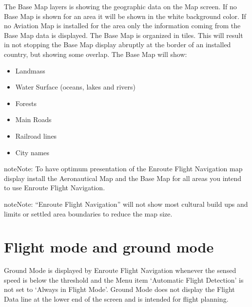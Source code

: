 \documentclass[letterpaper,10pt,english]{sphinxmanual}
\begin{document}
The Base Map layers is showing the geographic data on the Map screen. If no Base Map is shown for an area it will be shown in the white background color. If no Aviation Map is installed for the area only the information coming from the Base Map data is displayed. The Base Map is organized in tiles. This will result in not stopping the Base Map display abruptly at the border of an installed country, but showing some overlap.
The Base Map will show:
\begin{itemize}
\item {} 
Landmass

\item {} 
Water Surface (oceans, lakes and rivers)

\item {} 
Forests

\item {} 
Main Roads

\item {} 
Railroad lines

\item {} 
City names

\end{itemize}

\begin{sphinxadmonition}{note}{Note:}
To have optimum presentation of the Enroute Flight Navigation map display install the Aeronautical Map and the Base Map for all areas you intend to use Enroute Flight Navigation.
\end{sphinxadmonition}

\begin{sphinxadmonition}{note}{Note:}
“Enroute Flight Navigation” will not show  most cultural build ups and limits or settled area boundaries to reduce the map size.
\end{sphinxadmonition}


\section{Flight mode and ground mode}
\label{\detokenize{01-intro/getting_started:flight-mode-and-ground-mode}}
Ground Mode is displayed by Enroute Flight Navigation whenever the sensed speed is below the threshold and the Menu item ‘Automatic Flight Detection’ is not set to ‘Always in Flight Mode’.
Ground Mode does not display the Flight Data line at the lower end of the screen and is intended for flight planning.

\begin{figure}[htbp]
\centering

\noindent{}
\end{figure}
\end{document}
